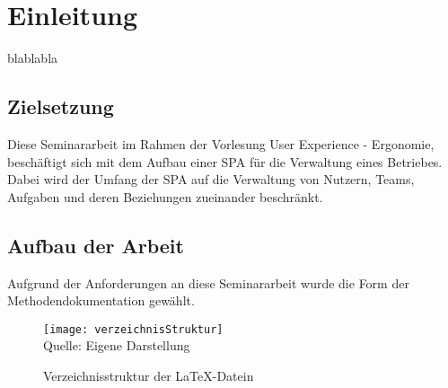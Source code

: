 \section{Einleitung}
blablabla

\subsection{Zielsetzung}
Diese Seminararbeit im Rahmen der Vorlesung User Experience - Ergonomie, beschäftigt sich mit dem Aufbau einer \ac{SPA} für die Verwaltung eines Betriebes.
Dabei wird der Umfang der \ac{SPA} auf die Verwaltung von Nutzern, Teams, Aufgaben und deren Beziehungen zueinander beschränkt.

\subsection{Aufbau der Arbeit}
Aufgrund der Anforderungen an diese Seminararbeit wurde die Form der Methodendokumentation gewählt.

\begin{figure}[H]
\caption{Verzeichnisstruktur der \LaTeX{}-Datein}\label{fig:verzeichnisStruktur}
\texttt{[image: verzeichnisStruktur]}
\\
Quelle: Eigene Darstellung
\end{figure}
